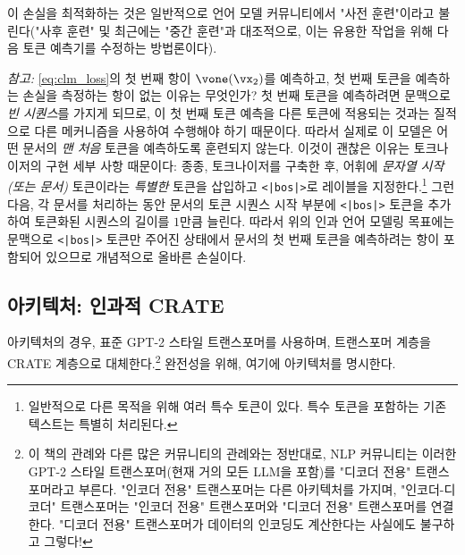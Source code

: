 \documentclass[../../book-main_ko.tex]{subfiles}
\begin{document}
이 손실을 최적화하는 것은 일반적으로 언어 모델 커뮤니티에서 "사전 훈련"이라고 불린다("사후 훈련" 및 최근에는 "중간 훈련"과 대조적으로, 이는 유용한 작업을 위해 다음 토큰 예측기를 수정하는 방법론이다).

\textit{참고:} \eqref{eq:clm_loss}의 첫 번째 항이 \(\vone(\vx_{2})\)를 예측하고, 첫 번째 토큰을 예측하는 손실을 측정하는 항이 없는 이유는 무엇인가? 첫 번째 토큰을 예측하려면 문맥으로 \textit{빈 시퀀스}를 가지게 되므로, 이 첫 번째 토큰 예측을 다른 토큰에 적용되는 것과는 질적으로 다른 메커니즘을 사용하여 수행해야 하기 때문이다. 따라서 실제로 이 모델은 어떤 문서의 \textit{맨 처음} 토큰을 예측하도록 훈련되지 않는다. 이것이 괜찮은 이유는 토크나이저의 구현 세부 사항 때문이다: 종종, 토크나이저를 구축한 후, 어휘에 \textit{문자열 시작(또는 문서)} 토큰이라는 \textit{특별한} 토큰을 삽입하고 \texttt{<|bos|>}로 레이블을 지정한다.\footnote{일반적으로 다른 목적을 위해 여러 특수 토큰이 있다. 특수 토큰을 포함하는 기존 텍스트는 특별히 처리된다.} 그런 다음, 각 문서를 처리하는 동안 문서의 토큰 시퀀스 시작 부분에 \texttt{<|bos|>} 토큰을 추가하여 토큰화된 시퀀스의 길이를 \(1\)만큼 늘린다. 따라서 위의 인과 언어 모델링 목표에는 문맥으로 \texttt{<|bos|>} 토큰만 주어진 상태에서 문서의 첫 번째 토큰을 예측하려는 항이 포함되어 있으므로 개념적으로 올바른 손실이다.

\subsection{아키텍처: 인과적 CRATE}

아키텍처의 경우, 표준 GPT-2 스타일 트랜스포머를 사용하며, 트랜스포머 계층을 CRATE 계층으로 대체한다.\footnote{이 책의 관례와 다른 많은 커뮤니티의 관례와는 정반대로, NLP 커뮤니티는 이러한 GPT-2 스타일 트랜스포머(현재 거의 모든 LLM을 포함)를 "디코더 전용" 트랜스포머라고 부른다. "인코더 전용" 트랜스포머는 다른 아키텍처를 가지며, "인코더-디코더" 트랜스포머는 "인코더 전용" 트랜스포머와 "디코더 전용" 트랜스포머를 연결한다. "디코더 전용" 트랜스포머가 데이터의 인코딩도 계산한다는 사실에도 불구하고 그렇다!} 완전성을 위해, 여기에 아키텍처를 명시한다.
\end{document}
